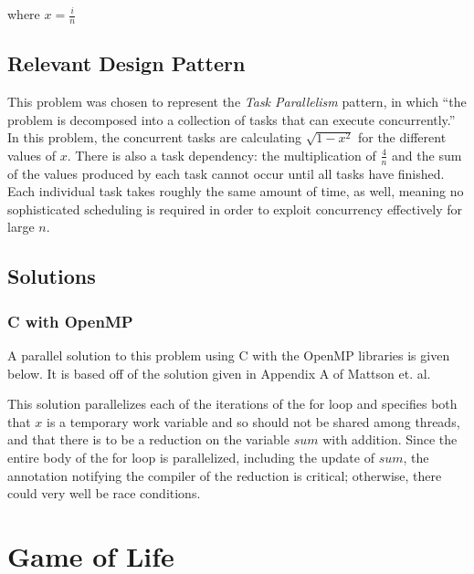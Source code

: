 where $x = \frac{i}{n}$

\subsection{Relevant Design Pattern}
This problem was chosen to represent the \textit{Task Parallelism} pattern, 
in which ``the problem is decomposed into a collection of tasks that can execute concurrently.'' %
In this problem, the concurrent tasks are calculating $\sqrt{1 - x^2}$ for the different values of $x$. 
There is also a task dependency: the multiplication of $\frac{4}{n}$ and the sum of the values produced by each task 
cannot occur until all tasks have finished. 
Each individual task takes roughly the same amount of time, as well, 
meaning no sophisticated scheduling is required in order to exploit concurrency effectively for large $n$.

\subsection{Solutions}
\subsubsection{C with OpenMP}
A parallel solution to this problem using C with the OpenMP libraries is given below. 
It is based off of the solution given in Appendix A of Mattson et. al. %



This solution parallelizes each of the iterations of the for loop 
and specifies both that $x$ is a temporary work variable and so should not be shared among threads, 
and that there is to be a reduction on the variable $sum$ with addition. 
Since the entire body of the for loop is parallelized, including the update of $sum$, 
the annotation notifying the compiler of the reduction is critical; 
otherwise, there could very well be race conditions.



\section{Game of Life}
